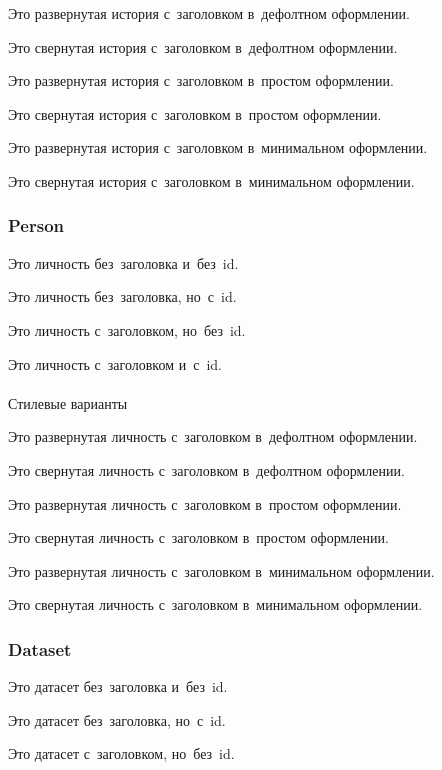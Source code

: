 \documentclass[
  russian,
  letterpaper,
  DIV=11,
  numbers=noendperiod,
  oneside]{scrreprt}
\makeatletter
\let\oldparagraph\paragraph
\renewcommand{\paragraph}{
    \@ifstar
      \xxxParagraphStar
      \xxxParagraphNoStar
  }
\newcommand{\xxxParagraphStar}[1]{\oldparagraph*{#1}\mbox{}}
\newcommand{\xxxParagraphNoStar}[1]{\oldparagraph{#1}\mbox{}}
\theoremstyle{definition}
\theoremstyle{plain}
\theoremstyle{plain}
\theoremstyle{definition}
\theoremstyle{plain}
\theoremstyle{plain}
\theoremstyle{plain}
\theoremstyle{plain}
\theoremstyle{definition}
\theoremstyle{remark}
\makeatother
\begin{document}
Это развернутая история с~заголовком в~дефолтном оформлении.

Это свернутая история с~заголовком в~дефолтном оформлении.

Это развернутая история с~заголовком в~простом оформлении.

Это свернутая история с~заголовком в~простом оформлении.

Это развернутая история с~заголовком в~минимальном оформлении.

Это свернутая история с~заголовком в~минимальном оформлении.

\subsubsection{Person}\label{debug-callout-person}

Это личность без~заголовка и~без~id.

\label{prs-debug-id}
Это личность без~заголовка, но~с~id.

Это личность с~заголовком, но~без~id.

\label{prs-debug-title-id}
Это личность с~заголовком и~с~id.

\paragraph{Стилевые варианты}\label{debug-callout-person-appearance}

Это развернутая личность с~заголовком в~дефолтном оформлении.

Это свернутая личность с~заголовком в~дефолтном оформлении.

Это развернутая личность с~заголовком в~простом оформлении.

Это свернутая личность с~заголовком в~простом оформлении.

Это развернутая личность с~заголовком в~минимальном оформлении.

Это свернутая личность с~заголовком в~минимальном оформлении.

\subsubsection{Dataset}\label{debug-callout-dataset}

Это датасет без~заголовка и~без~id.

\label{dts-debug-id}
Это датасет без~заголовка, но~с~id.

Это датасет с~заголовком, но~без~id.
\end{document}
